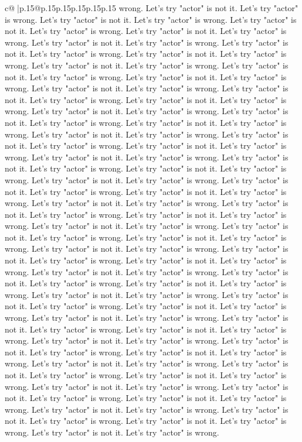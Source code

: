 \documentclass{article}
\begin{document}
{\begin{supertabular}{c@{$\;$}|p{.15\linewidth}@{}p{.15\linewidth}p{.15\linewidth}p{.15\linewidth}p{.15\linewidth}p{.15\linewidth}}
{{{wrong. Let's try "actor" is not it. Let's try "actor" is wrong. Let's try "actor" is not it. Let's try "actor" is wrong. Let's try "actor" is not it. Let's try "actor" is wrong. Let's try "actor" is not it. Let's try "actor" is wrong. Let's try "actor" is not it. Let's try "actor" is wrong. Let's try "actor" is not it. Let's try "actor" is wrong. Let's try "actor" is not it. Let's try "actor" is wrong. Let's try "actor" is not it. Let's try "actor" is wrong. Let's try "actor" is not it. Let's try "actor" is wrong. Let's try "actor" is not it. Let's try "actor" is wrong. Let's try "actor" is not it. Let's try "actor" is wrong. Let's try "actor" is not it. Let's try "actor" is wrong. Let's try "actor" is not it. Let's try "actor" is wrong. Let's try "actor" is not it. Let's try "actor" is wrong. Let's try "actor" is not it. Let's try "actor" is wrong. Let's try "actor" is not it. Let's try "actor" is wrong. Let's try "actor" is not it. Let's try "actor" is wrong. Let's try "actor" is not it. Let's try "actor" is wrong. Let's try "actor" is not it. Let's try "actor" is wrong. Let's try "actor" is not it. Let's try "actor" is wrong. Let's try "actor" is not it. Let's try "actor" is wrong. Let's try "actor" is not it. Let's try "actor" is wrong. Let's try "actor" is not it. Let's try "actor" is wrong. Let's try "actor" is not it. Let's try "actor" is wrong. Let's try "actor" is not it. Let's try "actor" is wrong. Let's try "actor" is not it. Let's try "actor" is wrong. Let's try "actor" is not it. Let's try "actor" is wrong. Let's try "actor" is not it. Let's try "actor" is wrong. Let's try "actor" is not it. Let's try "actor" is wrong. Let's try "actor" is not it. Let's try "actor" is wrong. Let's try "actor" is not it. Let's try "actor" is wrong. Let's try "actor" is not it. Let's try "actor" is wrong. Let's try "actor" is not it. Let's try "actor" is wrong. Let's try "actor" is not it. Let's try "actor" is wrong. Let's try "actor" is not it. Let's try "actor" is wrong. Let's try "actor" is not it. Let's try "actor" is wrong. Let's try "actor" is not it. Let's try "actor" is wrong. Let's try "actor" is not it. Let's try "actor" is wrong. Let's try "actor" is not it. Let's try "actor" is wrong. Let's try "actor" is not it. Let's try "actor" is wrong. Let's try "actor" is not it. Let's try "actor" is wrong. Let's try "actor" is not it. Let's try "actor" is wrong. Let's try "actor" is not it. Let's try "actor" is wrong. Let's try "actor" is not it. Let's try "actor" is wrong. Let's try "actor" is not it. Let's try "actor" is wrong. Let's try "actor" is not it. Let's try "actor" is wrong. Let's try "actor" is not it. Let's try "actor" is wrong. Let's try "actor" is not it. Let's try "actor" is wrong. Let's try "actor" is not it. Let's try "actor" is wrong. Let's try "actor" is not it. Let's try "actor" is wrong. Let's try "actor" is not it. Let's try "actor" is wrong. Let's try "actor" is not it. Let's try "actor" is wrong. Let's try "actor" is not it. Let's try "actor" is wrong. Let's try "actor" is not it. Let's try "actor" is wrong. Let's try "actor" is not it. Let's try "actor" is wrong. Let's try "actor" is not it. Let's try "actor" is wrong. }}}
\end{supertabular}}
\end{document}
